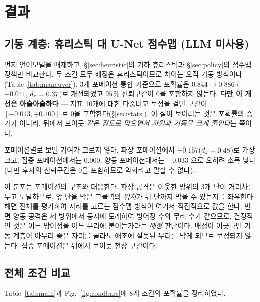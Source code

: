 \section{결과}
\label{sec:results}

\subsection{기동 계층: 휴리스틱 대 U-Net 점수맵 (LLM 미사용)}
\label{sec:res_maneuver}

먼저 언어모델을 배제하고, \S\ref{sec:heuristic}의 기하 휴리스틱과 \S\ref{sec:policy}의 점수맵 정책만 비교한다. 두 조건 모두 배정은 휴리스틱이므로 차이는 오직 기동 방식이다
(Table~\ref{tab:maneuver}). 3개 포메이션 통합 기준으로 포획률은 $0.844 \to 0.886$
($+0.041$, $d_z = 0.37$)로 개선되었고 $95\,\%$ 신뢰구간이 0을 포함하지 않는다.
\textbf{다만 이 개선은 아슬아슬하다} --- 지표 10개에 대한 다중비교 보정을 걸면 구간이
$[-0.013, +0.100]$ 로 0을 포함한다(\S\ref{sec:stats}). 이 절이 보이려는 것은 포획률의
증가가 아니라, 뒤에서 보이듯 \emph{같은 정도로 막으면서 자원과 기동을 크게 줄인다}는
쪽이다.



포메이션별로 보면 기여가 고르지 않다. 파상 포메이션에서 $+0.157$($d_z = 0.48$)로 가장 크고,
집중 포메이션에서는 $0.000$, 양동 포메이션에서는 $-0.033$ 으로 오히려 소폭 낮다(다만 후자의
신뢰구간은 0을 포함하므로 악화라고 말할 수 없다).

이 분포는 포메이션의 구조와 대응한다. 파상 공격은 이웃한 방위의 3개 단이 거리차를 두고
도달하므로, 앞 단을 막은 그물벽의 \emph{위치}가 뒤 단까지 막을 수 있는지를 좌우한다.
해면 전체를 평가하여 자리를 고르는 점수맵 방식이 여기서 직접적으로 값을 한다. 반면 양동
공격은 세 방위에서 동시에 도래하여 방어정 수와 무리 수가 같으므로, 결정적인 것은 어느
방어정을 어느 무리에 붙이는가라는 \emph{배정} 판단이다. 배정이 어긋나면 기동 계층이 아무리
좋은 자리를 골라도 애초에 잘못된 무리를 막게 되므로 보정되지 않는다. 집중 포메이션은
뒤에서 보이듯 천장 구간이다.

\subsection{전체 조건 비교}
\label{sec:res_main}

Table~\ref{tab:main}과 Fig.~\ref{fig:condbars}에 8개 조건의 포획률을 정리하였다.



